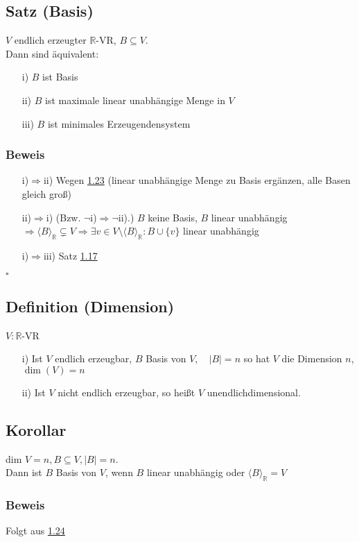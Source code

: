 \documentclass[a4paper, 12pt,titlepage, pdf, headsepline]{article}
\newcommand{\R}{\mathds{R}}
\newcommand{\vecspace}[2]{\langle#1\rangle_{#2}}
\newcommand{\vecspaceR}[1]{\vecspace{#1}{\R}}
\renewcommand{\>}{\rightarrow}
\renewcommand{\*}{\cdot}
\begin{document}
\subsection{Satz (Basis)}
\label{1.24}
$V$ endlich erzeugter $\R$-VR, $B\subseteq V$.\\
Dann sind äquivalent:
\begin{itemize}
	\item[i)] $B$ ist Basis
	\item[ii)] $B$ ist maximale linear unabhängige Menge in $V$
	\item[iii)] $B$ ist minimales Erzeugendensystem
\end{itemize}
\subsubsection*{Beweis}
\begin{itemize}
	\item[i)$\Rightarrow$ii)] Wegen \hyperref[1.23]{1.23} (linear unabhängige Menge zu Basis ergänzen, alle Basen gleich groß)
	\item[ii)$\Rightarrow$i)] (Bzw. $\neg$i)$\Rightarrow\neg$ii).) $B$ keine Basis, $B$ linear unabhängig\\
	      $\Rightarrow\langle B\rangle_\R\subsetneq V\Rightarrow\exists v\in V\setminus\langle B\rangle_\R\colon B\cup\{v\}$ linear unabhängig
	\item[i)$\Rightarrow$iii)] Satz \hyperref[1.17]{1.17} 
\end{itemize}\hfill$\square$
\subsection{Definition (Dimension)}
$V: \R $-VR\\
\begin{itemize}
	\item[i)] Ist $V$ endlich erzeugbar, $B$ Basis von $V,\quad|B| = n$ so hat $V$ die Dimension $n$, $\dim(V) = n$
	\item[ii)] Ist $V$ nicht endlich erzeugbar, so heißt $V$ unendlichdimensional. 
\end{itemize}
\subsection{Korollar}
\label{1.26}
dim $V = n, B \subseteq V, |B| = n$.\\
Dann ist $B$ Basis von $V$, wenn $B$ linear unabhängig oder $\vecspaceR{B} = V$
\subsubsection*{Beweis} Folgt aus \hyperref[1.24]{1.24}
\end{document}

